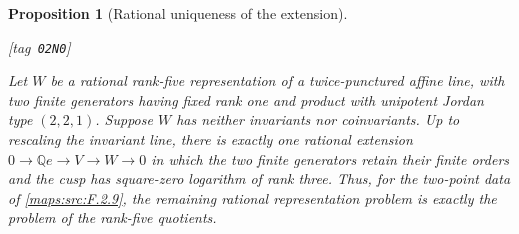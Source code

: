 \documentclass[11pt,a4paper]{article}
\numberwithin{equation}{section}
\newtheorem{proposition}[proposition]{Proposition}
\theoremstyle{definition}
\newcommand{\StatementRecord}[4]{{\upshape\footnotesize[tag~\texttt{#3}]}\enspace\ignorespaces}
\begin{document}
\begin{proposition}[Rational uniqueness of the extension]\hypertarget{tag-02N0}{}\label{maps:src:F.2.11}
\StatementRecord{maps:src:F.2.11}{proved}{02N0}{\cref{maps:src:F.2.9}, \eqref{maps:eq:F.32}}


Let $W$ be a rational rank-five representation of a
twice-punctured affine line, with two finite generators
having fixed rank one and product with unipotent Jordan type
$(2,2,1)$.  Suppose $W$ has neither invariants nor
coinvariants.  Up to rescaling the invariant line, there is
exactly one rational extension
$0\to\mathbb Qe\to V\to W\to0$ in which the two finite
generators retain their finite orders and the cusp has
square-zero logarithm of rank three.  Thus, for the two-point data of \ref{maps:src:F.2.9}, the remaining rational
representation problem is exactly the problem of the
rank-five quotients.  

\end{proposition}
\end{document}
